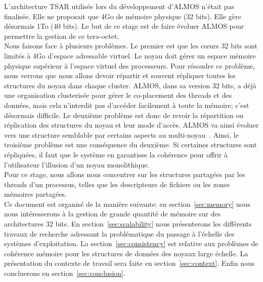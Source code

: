   L'architecture TSAR utilisée lors du développement d'ALMOS n'était pas
  finalisée. Elle ne proposait que 4Go de mémoire physique (32 bits). Elle gère
  désormais 1To (40 bits). Le but de ce stage est de faire évoluer ALMOS pour
  permettre la gestion de ce tera-octet.\\

  Nous faisons face à plusieurs problèmes. Le premier est que les c\oe urs 32
  bits sont limités à 4Go d'espace adressable virtuel. Le noyau doit gérer un
  espace mémoire physique supérieur à l'espace virtuel des processeurs. Pour
  résoudre ce problème, nous verrons que nous allons devoir répartir et souvent
  répliquer toutes les structures du noyau dans chaque cluster. ALMOS, dans sa
  version 32 bits, a déjà une organisation clusterisée pour gérer le
  co-placement des threads et des données, mais cela n'interdit pas d'accéder
  facilement à toute la mémoire; c'est désormais difficile. Le deuxième problème
  est donc de revoir la répartition ou réplication des structures du noyau et
  leur mode d'accès. ALMOS va ainsi évoluer vers une structure semblable par
  certains aspects au multi-noyau~\citep{baumann2009multikernel}. Ainsi, le
  troisième problème est une conséquence du deuxième. Si certaines structures
  sont répliquées, il faut que le système en garantisse la cohérence pour offrir
  à l'utilisateur l'illusion d'un noyau monolithique. \\

  Pour ce stage, nous allons nous concentrer sur les structures partagées par
  les threads d'un processus, telles que les descripteurs de fichiers ou les
  zones mémoires partagées. \\

  Ce document est organisé de la manière suivante: en section~\ref{sec:memory}
  nous nous intéresserons à la gestion de grande quantité de mémoire sur des
  architectures 32 bits. En section~\ref{sec:scalability} nous présenterons les
  différents travaux de recherche adressant la problématique du passage à
  l'échelle des systèmes d'exploitation.  La section~\ref{sec:consistency} est
  relative aux problèmes de cohérence mémoire pour les structures de données des
  noyaux large échelle. La présentation du contexte de travail sera faite en
  section~\ref{sec:context}. Enfin nous concluerons en
  section~\ref{sec:conclusion}.\newline
